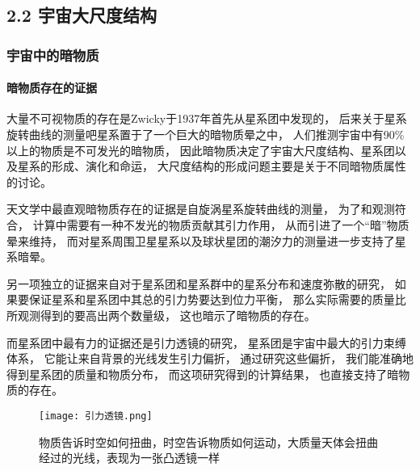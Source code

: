 \documentclass[8pt]{beamer}
\begin{document}
    \subsection{2.2 宇宙大尺度结构}
        \begin{frame}[fragile]
            \frametitle{宇宙中的暗物质}
            \framesubtitle{暗物质存在的证据}
            \begin{multicols}{2} 
                \qquad
                大量不可视物质的存在是Zwicky于1937年首先从星系团中发现的，
                后来关于星系旋转曲线的测量吧星系置于了一个巨大的暗物质晕之中，
                人们推测宇宙中有90\%以上的物质是不可发光的暗物质，
                因此暗物质决定了宇宙大尺度结构、星系团以及星系的形成、演化和命运，
                大尺度结构的形成问题主要是关于不同暗物质属性的讨论。

                \qquad
                天文学中最直观暗物质存在的证据是自旋涡星系旋转曲线的测量，
                为了和观测符合，
                计算中需要有一种不发光的物质贡献其引力作用，
                从而引进了一个“暗”物质晕来维持，
                而对星系周围卫星星系以及球状星团的潮汐力的测量进一步支持了星系暗晕。

                \qquad
                另一项独立的证据来自对于星系团和星系群中的星系分布和速度弥散的研究，
                如果要保证星系和星系团中其总的引力势要达到位力平衡，
                那么实际需要的质量比所观测得到的要高出两个数量级，
                这也暗示了暗物质的存在。

                \qquad
                而星系团中最有力的证据还是引力透镜的研究，
                星系团是宇宙中最大的引力束缚体系，
                它能让来自背景的光线发生引力偏折，
                通过研究这些偏折，
                我们能准确地得到星系团的质量和物质分布，
                而这项研究得到的计算结果，
                也直接支持了暗物质的存在。
                \begin{figure}[h]
                    \centering
                    \texttt{[image: 引力透镜.png]}  
                    \caption{物质告诉时空如何扭曲，时空告诉物质如何运动，大质量天体会扭曲经过的光线，表现为一张凸透镜一样}
                \end{figure}
            \end{multicols}
        \end{frame}
\end{document}
